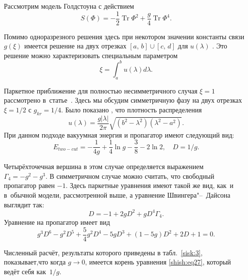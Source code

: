  Рассмотрим модель Голдстоуна
с действием
\begin{equation*}
S(\Phi)=-\frac{1}{2} \mathop{\mathrm{Tr}}\nolimits   \Phi^2+\frac{g}{4}\mathop{\mathrm{Tr}}\nolimits  \Phi^4.
\end{equation*}

Помимо одноразрезного решения здесь при некотором значении константы связи $g(\xi)$ имеется решение на двух отрезках $[a,\, b]\cup[c,\,d]$ для $u(\lambda)$ \cite{shish:shim}. Это решение можно характеризовать специальным параметром
\begin{equation*}
\xi=\int_a^b u(\lambda) d\lambda.
\end{equation*}

Паркетное приближение для полностью несимметричного случая $\xi=1$ рассмотрено в~статье~\cite{shish:sh3}. Здесь мы обсудим
симметричную фазу на двух отрезках $\xi=1/2$ с $g_{kr}=1/4$. 
Было показано \cite{shish:shim,shish:cic}, что плотность распределения 
\begin{equation*}
u(\lambda)=\frac{g|\lambda|}{2\pi}\sqrt{(b^2-\lambda^2)(\lambda^2-a^2)}.
\end{equation*}
При данном подходе вакуумная энергия и пропагатор имеют следующий
вид:
\begin{equation*}
E_{two-cut}=-\frac{1}{4g}+\frac{1}{4}\ln g-\frac{3}{8}-2\ln 2,
\quad D={1}/{g}.
\end{equation*}

Четырёхточечная вершина в этом случае определяется выражением
$%
\Gamma_4=-g^2-g^3. 
$ %
В симметричном случае можно считать, что свободный пропагатор
равен $-1$. Здесь паркетные уравнения имеют такой же вид, как~и в~обычной модели, рассмотренной выше, а уравнение Швингера"--~Дайсона
выглядит так:
$$
D=-1+2gD^2+gD^4\Gamma_4.
$$
Уравнение на пропагатор имеет вид
\begin{equation} \label{shish:eq27}
g^3D^6-g^2D^5+\frac{5}{4}g^2D^4-5gD^3+(1-5g)D^2+2D+1=0.
\end{equation}

Численный расчёт, результаты которого приведены в табл.~\ref{sisk:3}, показывает,что
когда $g\to 0$, имеется корень уравнения \eqref{shish:eq27}, который ведёт себя
как~$1/g$.


